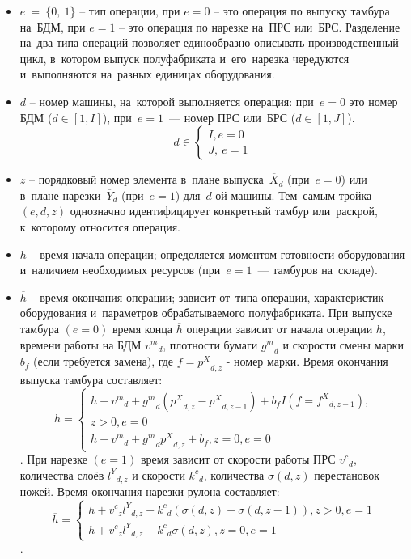 \begin{itemize}
    \item $e\  = \ \{ 0,\ 1\}$ -- тип операции, при $e = 0$ -- это операция по выпуску тамбура на~БДМ, при $e = 1$ -- это операция по нарезке на~ПРС или~БРС.
    Разделение на~два типа операций позволяет единообразно описывать производственный цикл, в~котором выпуск полуфабриката и~его~нарезка чередуются и~выполняются на~разных единицах оборудования.
    \item $d$ -- номер машины, на~которой выполняется операция: при~$e=0$ это номер БДМ ($d\in[1,I]$), при~$e=1$~--- номер ПРС или~БРС ($d\in[1,J]$).
    $$d \in \left\{ 
    \begin{array}{r}
    I,e = 0 \\
    J,\ e = 1
    \end{array} 
    \right.\ $$
    \item $z$ -- порядковый номер элемента в~плане выпуска~$\overline{X}_d$ (при~$e=0$) или в~плане нарезки~$\overline{Y}_d$ (при~$e=1$) для~$d$-ой машины.
    Тем~самым тройка~$(e,d,z)$ однозначно идентифицирует конкретный тамбур или~раскрой, к~которому относится операция.
    
    \item $h$ -- время начала операции; определяется моментом готовности оборудования и~наличием необходимых ресурсов (при~$e=1$~--- тамбуров на~складе).
    \item $\overline{h}$ -- время окончания операции; зависит от~типа операции, характеристик оборудования и~параметров обрабатываемого полуфабриката.
При выпуске тамбура $(e=0)$ время конца $\overline{h}$ операции зависит от начала операции $h$, времени работы на БДМ ${v^m}_{d}$, плотности бумаги ${g^m}_{d}$ и скорости смены марки $b_f$ (если требуется замена), где $f={p^X}_{d,z}$ - номер марки.
Время окончания выпуска тамбура составляет:
    $$
    {
        \overline{h}=\left\{        
        \begin{array}{r}
                 h+{v^m}_{d}+{g^m}_{d}({p^X}_{d,z}-{p^X}_{d,z-1})+b_fI(f={f^X}_{d,z-1}),\\z>0,e=0\\
                 h+{v^m}_{d}+{g^m}_{d}{p^X}_{d,z}+b_f,z=0,e=0
        \end{array}
        \right.
    }
    $$.
При нарезке $(e=1)$ время зависит от скорости работы ПРС ${v^c}_{d}$, количества слоёв ${{l^Y}}_{d,z}$ и скорости ${k^c}_{d}$, количества $\sigma(d,z)$ перестановок ножей.
Время окончания нарезки рулона составляет:
    \begin{equation}
        \label{eq:slitting_time}
    {
        \overline{h}=\left\{        
        \begin{array}{r}
                 h+{v^c}_{z}{{l^Y}}_{d,z}+{k^c}_{d}(\sigma(d,z)-\sigma(d,z-1)),z>0,e=1\\
                 h+{v^c}_{z}{{l^Y}}_{d,z}+{k^c}_{d}\sigma(d,z),z=0,e=1
        \end{array}
        \right.
    }
    \end{equation}.
    

\end{itemize}
